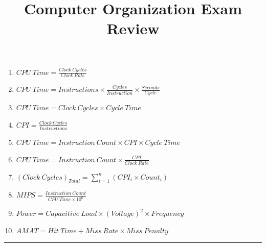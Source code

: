 \documentclass{article}
\title{Computer Organization Exam Review}
\date{}
\begin{document}
\maketitle
\begin{enumerate}
\item $CPU\ Time = \frac{Clock\ Cycles}{Clock\ Rate}$
\item $CPU\ Time = Instructions \times \frac{Cycles}{Instruction} \times \frac{Seconds}{Cycle}$
\item $CPU\ Time = Clock\ Cycles \times Cycle\ Time$
\item $CPI = \frac{Clock\ Cycles}{Instructions}$
\item $CPU\ Time = Instruction\ Count \times CPI \times Cycle\ Time$
\item $CPU\ Time = Instruction\ Count \times \frac{CPI}{Clock\ Rate}$
\item $(Clock\ Cycles)_{Total} = \sum_{i = 1}^{n}\left(CPI_{i} \times Count_{i}\right)$
\item $MIPS = \frac{Instruction\ Count}{CPU\ Time \times 10^{6}}$
\item $Power = Capacitive\ Load \times (Voltage)^{2} \times Frequency$
\item $AMAT = Hit\ Time + Miss\ Rate \times Miss\ Penalty$
\end{enumerate}
\hrule
\end{document}
